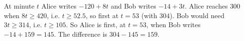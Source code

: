 At minute $t$ Alice writes $-120+8t$ and Bob writes $-14+3t$. Alice reaches $300$ when $8t\ge420$, i.e. $t\ge52.5$, so first at $t=53$ (with $304$). Bob would need $3t\ge314$, i.e. $t\ge105$. So Alice is first, at $t=53$, when Bob writes $-14+159=145$. The difference is $304-145=\boxed{159}$.
